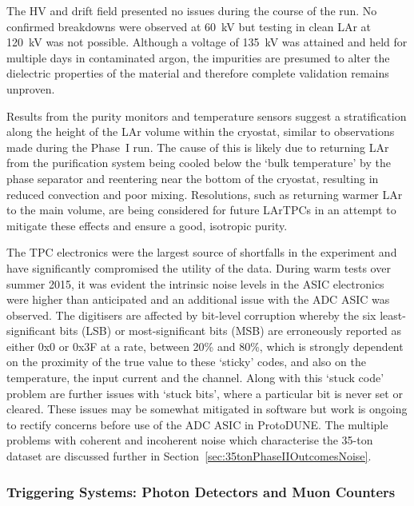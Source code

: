 The HV and drift field presented no issues during the course of the run.  No confirmed breakdowns were observed at 60~kV but testing in clean LAr at 120~kV was not possible.  Although a voltage of 135~kV was attained and held for multiple days in contaminated argon, the impurities are presumed to alter the dielectric properties of the material and therefore complete validation remains unproven.

Results from the purity monitors and temperature sensors suggest a stratification along the height of the LAr volume within the cryostat, similar to observations made during the Phase~I run.  The cause of this is likely due to returning LAr from the purification system being cooled below the `bulk temperature' by the phase separator and reentering near the bottom of the cryostat, resulting in reduced convection and poor mixing.  Resolutions, such as returning warmer LAr to the main volume, are being considered for future LArTPCs in an attempt to mitigate these effects and ensure a good, isotropic purity.

The TPC electronics were the largest source of shortfalls in the experiment and have significantly compromised the utility of the data.  During warm tests over summer 2015, it was evident the intrinsic noise levels in the ASIC electronics were higher than anticipated and an additional issue with the ADC ASIC was observed.  The digitisers are affected by bit-level corruption whereby the six least-significant bits (LSB) or most-significant bits (MSB) are erroneously reported as either 0x0 or 0x3F at a rate, between 20\% and 80\%, which is strongly dependent on the proximity of the true value to these `sticky' codes, and also on the temperature, the input current and the channel.  Along with this `stuck code' problem are further issues with `stuck bits', where a particular bit is never set or cleared.  These issues may be somewhat mitigated in software but work is ongoing to rectify concerns before use of the ADC ASIC in ProtoDUNE.  The multiple problems with coherent and incoherent noise which characterise the 35-ton dataset are discussed further in Section~\ref{sec:35tonPhaseIIOutcomesNoise}.

\subsubsection{Triggering Systems: Photon Detectors and Muon Counters}\label{sec:35tonPhaseIIOutcomesTriggeringSystems}

